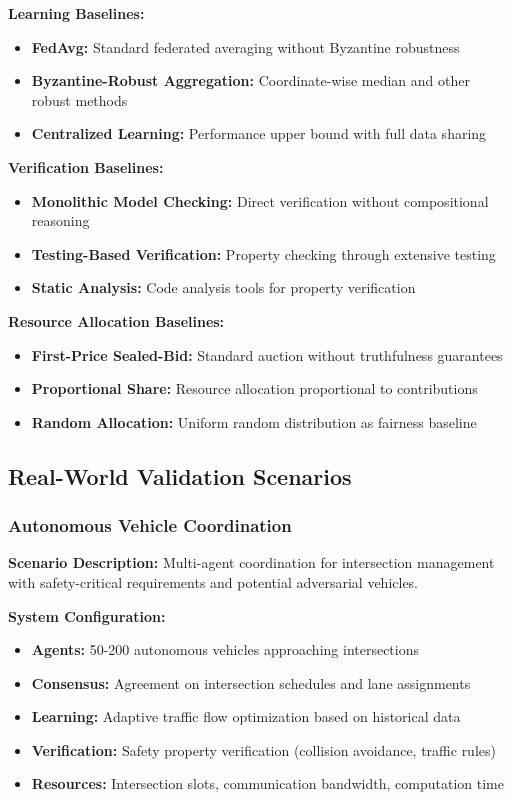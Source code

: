 \documentclass[conference]{IEEEtran}
\begin{document}
\textbf{Learning Baselines:}
\begin{itemize}
    \item \textbf{FedAvg:} Standard federated averaging without Byzantine robustness
    \item \textbf{Byzantine-Robust Aggregation:} Coordinate-wise median and other robust methods
    \item \textbf{Centralized Learning:} Performance upper bound with full data sharing
\end{itemize}

\textbf{Verification Baselines:}
\begin{itemize}
    \item \textbf{Monolithic Model Checking:} Direct verification without compositional reasoning
    \item \textbf{Testing-Based Verification:} Property checking through extensive testing
    \item \textbf{Static Analysis:} Code analysis tools for property verification
\end{itemize}

\textbf{Resource Allocation Baselines:}
\begin{itemize}
    \item \textbf{First-Price Sealed-Bid:} Standard auction without truthfulness guarantees
    \item \textbf{Proportional Share:} Resource allocation proportional to contributions
    \item \textbf{Random Allocation:} Uniform random distribution as fairness baseline
\end{itemize}

\subsection{Real-World Validation Scenarios}

\subsubsection{Autonomous Vehicle Coordination}

\textbf{Scenario Description:} Multi-agent coordination for intersection management with safety-critical requirements and potential adversarial vehicles.

\textbf{System Configuration:}
\begin{itemize}
    \item \textbf{Agents:} 50-200 autonomous vehicles approaching intersections
    \item \textbf{Consensus:} Agreement on intersection schedules and lane assignments
    \item \textbf{Learning:} Adaptive traffic flow optimization based on historical data
    \item \textbf{Verification:} Safety property verification (collision avoidance, traffic rules)
    \item \textbf{Resources:} Intersection slots, communication bandwidth, computation time
\end{itemize}
\end{document}
